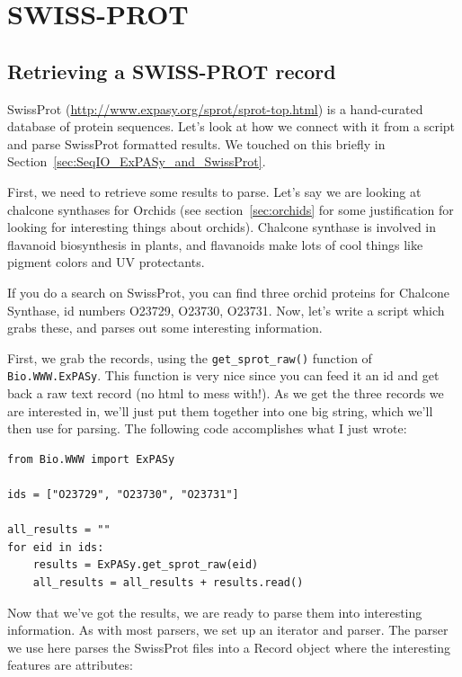 \documentclass{report}
\begin{document}
\section{SWISS-PROT}
\label{sec:swiss_prot}

\subsection{Retrieving a SWISS-PROT record}

SwissProt (\url{http://www.expasy.org/sprot/sprot-top.html}) is a hand-curated database of protein sequences. Let's look at how we connect with it from a script and parse SwissProt formatted results. We touched on this briefly in Section~\ref{sec:SeqIO_ExPASy_and_SwissProt}.


First, we need to retrieve some results to parse. Let's say we are looking at chalcone synthases for Orchids (see section~\ref{sec:orchids} for some justification for looking for interesting things about orchids). Chalcone synthase is involved in flavanoid biosynthesis in plants, and flavanoids make lots of cool things like pigment colors and UV protectants. 


If you do a search on SwissProt, you can find three orchid proteins for Chalcone Synthase, id numbers O23729, O23730, O23731. Now, let's write a script which grabs these, and parses out some interesting information.


First, we grab the records, using the \verb|get_sprot_raw()| function of \verb|Bio.WWW.ExPASy|. This function is very nice since you can feed it an id and get back a raw text record (no html to mess with!). As we get the three records we are interested in, we'll just put them together into one big string, which we'll then use for parsing. The following code accomplishes what I just wrote:

\begin{verbatim}
from Bio.WWW import ExPASy

ids = ["O23729", "O23730", "O23731"]

all_results = ""
for eid in ids:
    results = ExPASy.get_sprot_raw(eid)
    all_results = all_results + results.read()
\end{verbatim}

Now that we've got the results, we are ready to parse them into interesting information. As with most parsers, we set up an iterator and parser. The parser we use here parses the SwissProt files into a Record object where the interesting features are attributes:
\end{document}
